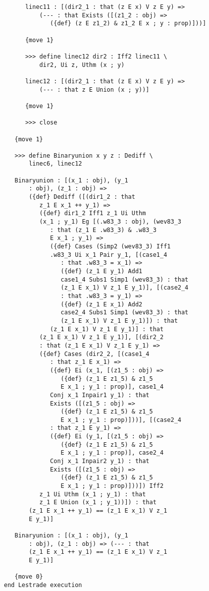 \documentclass[12pt]{article}
\begin{document}
\begin{verbatim}
      linec11 : [(dir2_1 : that (z E x) V z E y) => 
          (--- : that Exists ([(z1_2 : obj) => 
             ({def} (z E z1_2) & z1_2 E x ; y : prop)]))]

      {move 1}

      >>> define linec12 dir2 : Iff2 linec11 \
          dir2, Ui z, Uthm (x ; y)

      linec12 : [(dir2_1 : that (z E x) V z E y) => 
          (--- : that z E Union (x ; y))]

      {move 1}

      >>> close

   {move 1}

   >>> define Binaryunion x y z : Dediff \
       linec6, linec12

   Binaryunion : [(x_1 : obj), (y_1 
       : obj), (z_1 : obj) => 
       ({def} Dediff ([(dir1_2 : that 
          z_1 E x_1 ++ y_1) => 
          ({def} dir1_2 Iff1 z_1 Ui Uthm 
          (x_1 ; y_1) Eg [(.w83_3 : obj), (wev83_3 
             : that (z_1 E .w83_3) & .w83_3 
             E x_1 ; y_1) => 
             ({def} Cases (Simp2 (wev83_3) Iff1 
             .w83_3 Ui x_1 Pair y_1, [(case1_4 
                : that .w83_3 = x_1) => 
                ({def} (z_1 E y_1) Add1 
                case1_4 Subs1 Simp1 (wev83_3) : that 
                (z_1 E x_1) V z_1 E y_1)], [(case2_4 
                : that .w83_3 = y_1) => 
                ({def} (z_1 E x_1) Add2 
                case2_4 Subs1 Simp1 (wev83_3) : that 
                (z_1 E x_1) V z_1 E y_1)]) : that 
             (z_1 E x_1) V z_1 E y_1)] : that 
          (z_1 E x_1) V z_1 E y_1)], [(dir2_2 
          : that (z_1 E x_1) V z_1 E y_1) => 
          ({def} Cases (dir2_2, [(case1_4 
             : that z_1 E x_1) => 
             ({def} Ei (x_1, [(z1_5 : obj) => 
                ({def} (z_1 E z1_5) & z1_5 
                E x_1 ; y_1 : prop)], case1_4 
             Conj x_1 Inpair1 y_1) : that 
             Exists ([(z1_5 : obj) => 
                ({def} (z_1 E z1_5) & z1_5 
                E x_1 ; y_1 : prop)]))], [(case2_4 
             : that z_1 E y_1) => 
             ({def} Ei (y_1, [(z1_5 : obj) => 
                ({def} (z_1 E z1_5) & z1_5 
                E x_1 ; y_1 : prop)], case2_4 
             Conj x_1 Inpair2 y_1) : that 
             Exists ([(z1_5 : obj) => 
                ({def} (z_1 E z1_5) & z1_5 
                E x_1 ; y_1 : prop)]))]) Iff2 
          z_1 Ui Uthm (x_1 ; y_1) : that 
          z_1 E Union (x_1 ; y_1))]) : that 
       (z_1 E x_1 ++ y_1) == (z_1 E x_1) V z_1 
       E y_1)]

   Binaryunion : [(x_1 : obj), (y_1 
       : obj), (z_1 : obj) => (--- : that 
       (z_1 E x_1 ++ y_1) == (z_1 E x_1) V z_1 
       E y_1)]

   {move 0}
end Lestrade execution
\end{verbatim}
\end{document}
